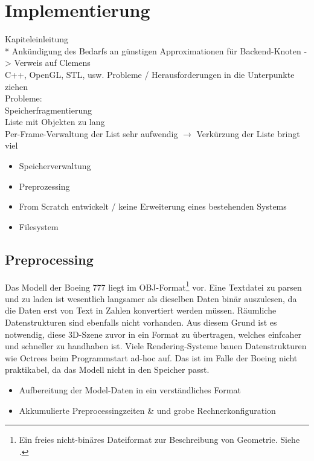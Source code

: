 
\chapter{Implementierung}
\label{chap:impl}
Kapiteleinleitung\\*
Ankündigung des Bedarfs an günstigen Approximationen für Backend-Knoten -> Verweis auf Clemens\\
C++, OpenGL, STL, usw.
Probleme / Herausforderungen in die Unterpunkte ziehen\\
Probleme:\\
Speicherfragmentierung\\
Liste mit Objekten zu lang\\
Per-Frame-Verwaltung der List sehr aufwendig $\rightarrow$ Verkürzung der Liste bringt viel
\begin{itemize}
 \item Speicherverwaltung
 \item Preprozessing
 \item From Scratch entwickelt / keine Erweiterung eines bestehenden Systems
 \item Filesystem
\end{itemize}

\section{Preprocessing}
\label{sec:impl:preprocessing}
Das Modell der Boeing 777 liegt im OBJ-Format\footnote{Ein freies nicht-binäres Dateiformat zur Beschreibung von Geometrie. Siehe \cite{obj}. } vor. Eine Textdatei zu parsen und zu laden ist wesentlich langsamer als dieselben Daten binär auszulesen, da die Daten erst von Text in Zahlen konvertiert werden müssen. Räumliche Datenstrukturen sind ebenfalls nicht vorhanden. Aus diesem Grund ist es notwendig, diese 3D-Szene zuvor in ein Format zu übertragen, welches einfcaher und schneller zu handhaben ist. Viele Rendering-Systeme bauen Datenstrukturen wie Octrees beim Programmstart ad-hoc auf. Das ist im Falle der Boeing nicht praktikabel, da das Modell nicht in den Speicher passt.
\cite{obj}\\
%
\begin{itemize}
 \item Aufbereitung der Model-Daten in ein verständliches Format
 \item Akkumulierte Preprocessingzeiten \& und grobe Rechnerkonfiguration
\end{itemize}

